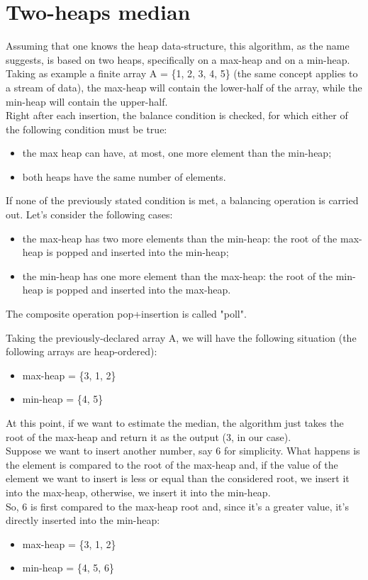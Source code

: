 \documentclass[paper=a4wide, fontsize=12pt]{scrartcl}	 %
\begin{document}
\section*{Two-heaps median}
Assuming that one knows the heap data-structure, this algorithm, as the name suggests, is based on two heaps, specifically on a max-heap and on a min-heap. \\
Taking as example a finite array A = \{1, 2, 3, 4, 5\} (the same concept applies to a stream of data), the max-heap will contain the lower-half of the array, while the min-heap will contain the upper-half. \\
Right after each insertion, the balance condition is checked, for which either of the following condition must be true:
\begin{itemize}
    \item the max heap can have, at most, one more element than the min-heap;
    \item both heaps have the same number of elements.
\end{itemize}

If none of the previously stated condition is met, a balancing operation is carried out.
Let's consider the following cases:
\begin{itemize}
    \item the max-heap has two more elements than the min-heap: the root of the max-heap is popped and inserted into the min-heap; 
    \item the min-heap has one more element than the max-heap: the root of the min-heap is popped and inserted into the max-heap.
\end{itemize} 

The composite operation pop+insertion is called "poll".

Taking the previously-declared array A, we will have the following situation (the following arrays are heap-ordered):
\begin{itemize}
    \item max-heap = \{3, 1, 2\}
    \item min-heap = \{4, 5\} 
\end{itemize}
At this point, if we want to estimate the median, the algorithm just takes the root of the max-heap and return it as the output (3, in our case). \\
Suppose we want to insert another number, say 6 for simplicity. What happens is the element is compared to the root of the max-heap and, if the value of the element we want to insert is less or equal than the considered root, we insert it into the max-heap, otherwise, we insert it into the min-heap. \\
So, 6 is first compared to the max-heap root and, since it's a greater value, it's directly inserted into the min-heap: 
\begin{itemize}
    \item max-heap = \{3, 1, 2\}
    \item min-heap = \{4, 5, 6\} 
\end{itemize}
\end{document}
